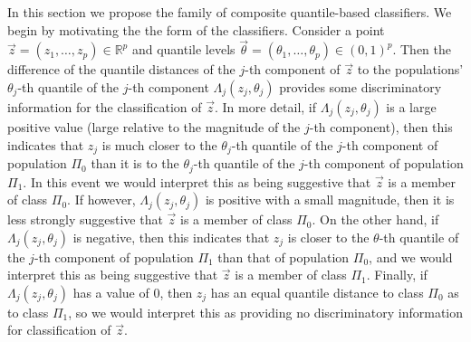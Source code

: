 In this section we propose the family of composite quantile-based classifiers.
We begin by motivating the the form of the classifiers.  Consider a point
$\vec{z} = (z_1, \dots, z_p) \in \mathbb{R}^p$ and quantile levels
$\vec{\theta} = (\theta_1, \dots, \theta_p) \in (0, 1)^p$.  Then the difference
of the quantile distances of the $j$-th component of $\vec{z}$ to the
populations' $\theta_j$-th quantile of the $j$-th component
$\Lambda_j(z_j, \theta_j)$ provides some discriminatory information for the
classification of $\vec{z}$.  In more detail, if $\Lambda_j(z_j, \theta_j)$ is a
large positive value (large relative to the magnitude of the $j$-th component),
then this indicates that $z_j$ is much closer to the $\theta_j$-th quantile of
the $j$-th component of population $\Pi_0$ than it is to the $\theta_j$-th
quantile of the $j$-th component of population $\Pi_1$.  In this event we would
interpret this as being suggestive that $\vec{z}$ is a member of class $\Pi_0$.
If however, $\Lambda_j(z_j, \theta_j)$ is positive with a small magnitude, then
it is less strongly suggestive that $\vec{z}$ is a member of class $\Pi_0$.  On
the other hand, if $\Lambda_j(z_j, \theta_j)$ is negative, then this indicates
that $z_j$ is closer to the $\theta$-th quantile of the $j$-th component of
population $\Pi_1$ than that of population $\Pi_0$, and we would interpret this
as being suggestive that $\vec{z}$ is a member of class $\Pi_1$.  Finally, if
$\Lambda_j(z_j, \theta_j)$ has a value of 0, then $z_j$ has an equal quantile
distance to class $\Pi_0$ as to class $\Pi_1$, so we would interpret this as
providing no discriminatory information for classification of $\vec{z}$.

